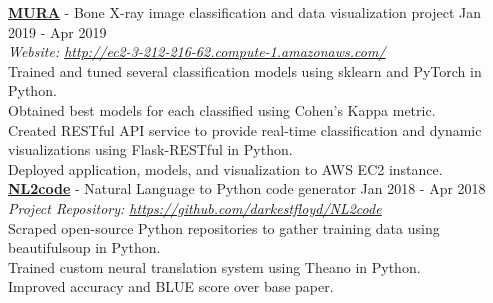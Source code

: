 \documentclass[a4paper]{article}
\newcommand{\mybullet}{
	\indent 
  \textbullet \hspace*{2mm}
}
\begin{document}
      \noindent
      \textbf{\href{http://ec2-3-212-216-62.compute-1.amazonaws.com/}{MURA}} - Bone X-ray image 
      classification and data visualization project \hfill Jan 2019 - Apr 2019 \\
      \hfill \textit{Website: \href{http://ec2-3-212-216-62.compute-1.amazonaws.com/}{http://ec2-3-212-216-62.compute-1.amazonaws.com/}}\\
      \mybullet Trained and tuned several classification models using sklearn and PyTorch in Python. \\
      \mybullet Obtained best models for each classified using Cohen's Kappa metric. \\
      \mybullet Created RESTful API service to provide real-time classification and dynamic visualizations
      using Flask-RESTful in Python. \\
      \mybullet Deployed application, models, and visualization to AWS EC2 instance. \\

			\noindent
      \textbf{\href{https://github.com/darkestfloyd/NL2code}{NL2code}} - Natural Language to 
      Python code generator \hfill Jan 2018 - Apr 2018 \\
      \hfill \textit{Project Repository: \href{https://github.com/darkestfloyd/NL2code}{https://github.com/darkestfloyd/NL2code}}\\
      \mybullet Scraped open-source Python repositories to gather training data 
      using beautifulsoup in Python. \\
      \mybullet Trained custom neural translation system using Theano in Python. \\
      \mybullet Improved accuracy and BLUE score over base paper. \\
\end{document}
